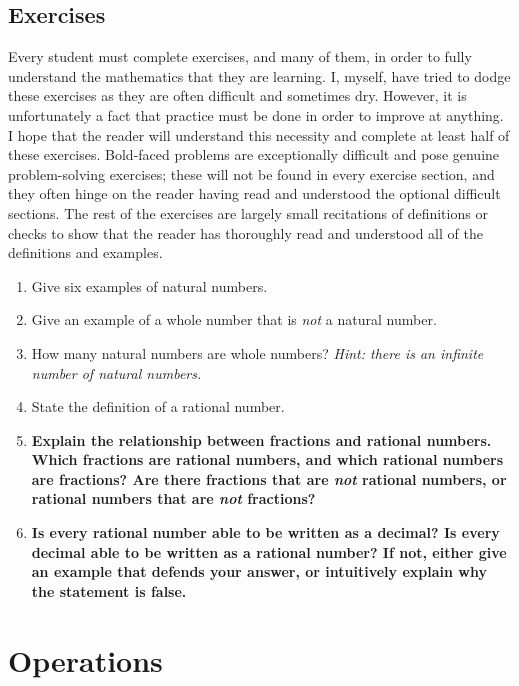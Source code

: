 \documentclass[openany]{book}
\begin{document}
\section{Exercises}
Every student must complete exercises, and many of them, in order to fully understand the mathematics that they are learning. I, myself, have tried to dodge these exercises as they are often difficult and sometimes dry. However, it is unfortunately a fact that practice must be done in order to improve at anything. I hope that the reader will understand this necessity and complete at least half of these exercises. Bold-faced problems are exceptionally difficult and pose genuine problem-solving exercises; these will not be found in every exercise section, and they often hinge on the reader having read and understood the optional difficult sections. The rest of the exercises are largely small recitations of definitions or checks to show that the reader has thoroughly read and understood all of the definitions and examples.
\begin{enumerate}
	\item Give six examples of natural numbers.
	\item Give an example of a whole number that is \textit{not} a natural number.
	\item How many natural numbers are whole numbers? \textit{Hint: there is an infinite number of natural numbers.}
	\item State the definition of a rational number.
	\item \textbf{Explain the relationship between fractions and rational numbers. Which fractions are rational numbers, and which rational numbers are fractions? Are there fractions that are \textit{not} rational numbers, or rational numbers that are \textit{not} fractions?}
	\item \textbf{Is every rational number able to be written as a decimal? Is every decimal able to be written as a rational number? If not, either give an example that defends your answer, or intuitively explain why the statement is false.}
\end{enumerate}

\chapter{Operations}
\end{document}
